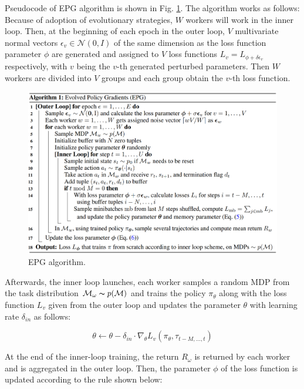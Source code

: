 \par
Pseudocode of EPG algorithm is shown in Fig. \ref{epg}. The algorithm works as follows: Because of adoption of evolutionary strategies, $\textit{W}$ workers will work in the inner loop. Then, at the beginning of each epoch in the outer loop, $\textit{V}$ multivariate normal vectors $\epsilon_v \in \mathcal{N}(0,I)$ of the same dimension as the loss function parameter $\phi$ are generated and assigned to $\textit{V}$ loss functions $L_v = L_{\phi+\delta\epsilon_v}$ respectively, with $\textit{v}$ being the $\textit{v}$-th generated perturbed parameters. Then $\textit{W}$ workers are divided into $\textit{V}$ groups and each group obtain the $\textit{v}$-th loss function.
\begin{figure}[H]
	\includegraphics[scale=0.4]{epg.png}
	\centering
	\caption{EPG algorithm.}
	\label{epg}
\end{figure}

\par
Afterwards, the inner loop launches, each worker samples a random MDP from the task distribution $\mathcal{M}_\omega\thicksim p(\mathcal{M})$ and trains the policy $\pi_\theta$ along with the loss function $L_v$ given from the outer loop and updates the parameter $\theta$ with learning rate $\delta_{in}$ as follows:

\[\theta\gets\theta - \delta_{in}\cdot\nabla_\theta L_v(\pi_\theta,\tau_{t-M,...,t})\]

\par
At the end of the inner-loop training, the return $R_\omega$ is returned by each worker and is aggregated in the outer loop. Then, the parameter $\phi$ of the loss function is updated according to the rule shown below:

